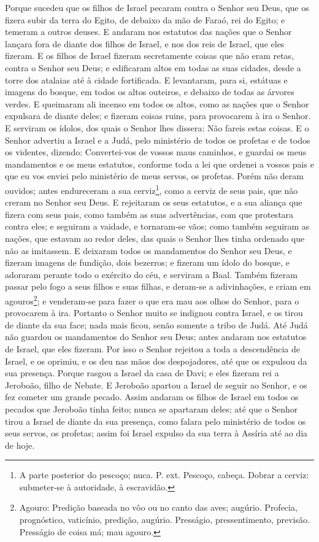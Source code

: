 Porque sucedeu que os filhos de Israel pecaram contra o Senhor seu
Deus, que os fizera subir da terra do Egito, de debaixo da mão de
Faraó, rei do Egito; e temeram a outros deuses. E andaram nos
estatutos das nações que o Senhor lançara fora de diante dos filhos
de Israel, e nos dos reis de Israel, que eles fizeram. E os
filhos de Israel fizeram secretamente coisas que não eram retas,
contra o Senhor seu Deus; e edificaram altos em todas as suas
cidades, desde a torre dos atalaias até à cidade fortificada.
E levantaram, para si, estátuas e imagens do bosque, em todos
os altos outeiros, e debaixo de todas as árvores verdes. E
queimaram ali incenso em todos os altos, como as nações que o Senhor
expulsara de diante deles; e fizeram coisas ruins, para provocarem à
ira o Senhor. E serviram os ídolos, dos quais o Senhor lhes
dissera: Não fareis estas coisas. E o Senhor advertiu a
Israel e a Judá, pelo ministério de todos os profetas e de todos os
videntes, dizendo: Convertei-vos de vossos maus caminhos, e guardai
os meus mandamentos e os meus estatutos, conforme toda a lei que
ordenei a vossos pais e que eu vos enviei pelo ministério de meus
servos, os profetas. Porém não deram ouvidos; antes
endureceram a sua cerviz\footnote{A parte posterior do pescoço;
nuca. P. ext. Pescoço, cabeça. Dobrar a cerviz: submeter-se à
autoridade, à escravidão.}, como a cerviz de seus pais, que não
creram no Senhor seu Deus. E rejeitaram os seus estatutos, e
a sua aliança que fizera com seus pais, como também as suas
advertências, com que protestara contra eles; e seguiram a vaidade,
e tornaram-se vãos; como também seguiram as nações, que estavam ao
redor deles, das quais o Senhor lhes tinha ordenado que não as
imitassem. E deixaram todos os mandamentos do Senhor seu
Deus, e fizeram imagens de fundição, dois bezerros; e fizeram um
ídolo do bosque, e adoraram perante todo o exército do céu, e
serviram a Baal. Também fizeram passar pelo fogo a seus
filhos e suas filhas, e deram-se a adivinhações, e criam em
agouros\footnote{Agouro: Predição baseada no vôo ou no canto das
aves; augúrio. Profecia, prognóstico, vaticínio, predição, augúrio.
Presságio, pressentimento, previsão. Presságio de coisa má; mau
agouro.}; e venderam-se para fazer o que era mau aos olhos do
Senhor, para o provocarem à ira. Portanto o Senhor muito se
indignou contra Israel, e os tirou de diante da sua face; nada mais
ficou, senão somente a tribo de Judá. Até Judá não guardou os
mandamentos do Senhor seu Deus; antes andaram nos estatutos de
Israel, que eles fizeram. Por isso o Senhor rejeitou a toda a
descendência de Israel, e os oprimiu, e os deu nas mãos dos
despojadores, até que os expulsou da sua presença. Porque
rasgou a Israel da casa de Davi; e eles fizeram rei a Jeroboão,
filho de Nebate. E Jeroboão apartou a Israel de seguir ao Senhor, e
os fez cometer um grande pecado. Assim andaram os filhos de
Israel em todos os pecados que Jeroboão tinha feito; nunca se
apartaram deles; até que o Senhor tirou a Israel de diante da
sua presença, como falara pelo ministério de todos os seus servos,
os profetas; assim foi Israel expulso da sua terra à Assíria até ao
dia de hoje.

